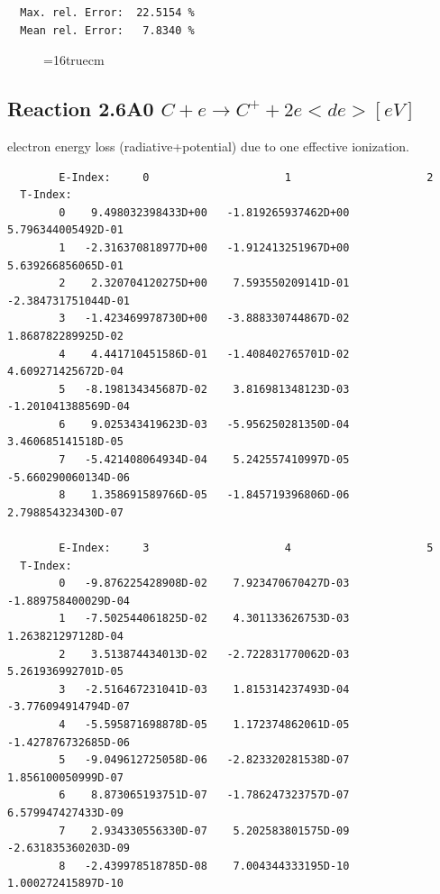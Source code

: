 \documentclass[12pt,dvips]{article}
\begin{document}
\begin{small}
\begin{verbatim}
  Max. rel. Error:  22.5154 %
  Mean rel. Error:   7.8340 %

\end{verbatim}\end{small}
\begin{figure} \label{2.3.13aec}
\epsfxsize=16truecm
\end{figure}
\newpage


\subsection{
  Reaction 2.6A0 $C  + e \rightarrow C^+   + 2e  <de> [eV] $
}

  electron energy loss (radiative+potential) due to one effective ionization.

\begin{small}\begin{verbatim}
        E-Index:     0                     1                     2
  T-Index:
        0    9.498032398433D+00   -1.819265937462D+00    5.796344005492D-01
        1   -2.316370818977D+00   -1.912413251967D+00    5.639266856065D-01
        2    2.320704120275D+00    7.593550209141D-01   -2.384731751044D-01
        3   -1.423469978730D+00   -3.888330744867D-02    1.868782289925D-02
        4    4.441710451586D-01   -1.408402765701D-02    4.609271425672D-04
        5   -8.198134345687D-02    3.816981348123D-03   -1.201041388569D-04
        6    9.025343419623D-03   -5.956250281350D-04    3.460685141518D-05
        7   -5.421408064934D-04    5.242557410997D-05   -5.660290060134D-06
        8    1.358691589766D-05   -1.845719396806D-06    2.798854323430D-07

        E-Index:     3                     4                     5
  T-Index:
        0   -9.876225428908D-02    7.923470670427D-03   -1.889758400029D-04
        1   -7.502544061825D-02    4.301133626753D-03    1.263821297128D-04
        2    3.513874434013D-02   -2.722831770062D-03    5.261936992701D-05
        3   -2.516467231041D-03    1.815314237493D-04   -3.776094914794D-07
        4   -5.595871698878D-05    1.172374862061D-05   -1.427876732685D-06
        5   -9.049612725058D-06   -2.823320281538D-07    1.856100050999D-07
        6    8.873065193751D-07   -1.786247323757D-07    6.579947427433D-09
        7    2.934330556330D-07    5.202583801575D-09   -2.631835360203D-09
        8   -2.439978518785D-08    7.004344333195D-10    1.000272415897D-10


\end{verbatim}
\end{small}
\end{document}
